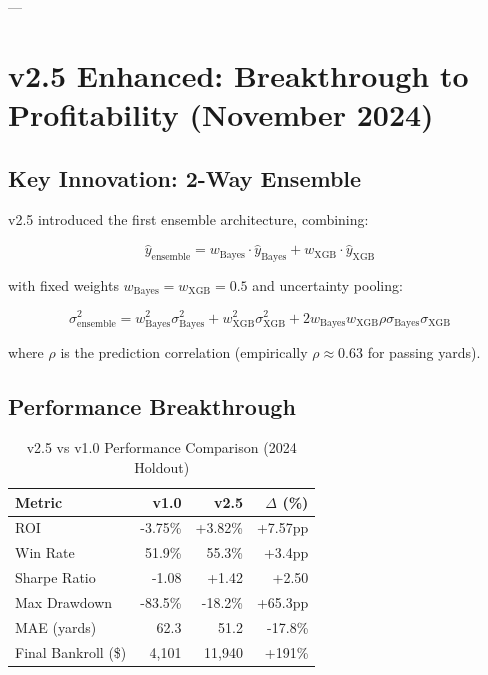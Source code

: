 ---

\section{v2.5 Enhanced: Breakthrough to Profitability (November 2024)}

\subsection{Key Innovation: 2-Way Ensemble}

v2.5 introduced the first ensemble architecture, combining:

\begin{equation}
\hat{y}_{\text{ensemble}} = w_{\text{Bayes}} \cdot \hat{y}_{\text{Bayes}} + w_{\text{XGB}} \cdot \hat{y}_{\text{XGB}}
\label{eq:v2-5-ensemble}
\end{equation}

with fixed weights $w_{\text{Bayes}} = w_{\text{XGB}} = 0.5$ and uncertainty pooling:

\begin{equation}
\sigma^2_{\text{ensemble}} = w_{\text{Bayes}}^2 \sigma^2_{\text{Bayes}} + w_{\text{XGB}}^2 \sigma^2_{\text{XGB}} + 2 w_{\text{Bayes}} w_{\text{XGB}} \rho \sigma_{\text{Bayes}} \sigma_{\text{XGB}}
\label{eq:ensemble-variance}
\end{equation}

where $\rho$ is the prediction correlation (empirically $\rho \approx 0.63$ for passing yards).

\subsection{Performance Breakthrough}

\begin{table}[h]
\centering
\caption{v2.5 vs v1.0 Performance Comparison (2024 Holdout)}
\label{tab:v2-5-vs-v1}
\begin{tabular}{lrrr}
\toprule
\textbf{Metric} & \textbf{v1.0} & \textbf{v2.5} & \textbf{$\Delta$ (\%)} \\
\midrule
ROI & -3.75\% & +3.82\% & +7.57pp \\
Win Rate & 51.9\% & 55.3\% & +3.4pp \\
Sharpe Ratio & -1.08 & +1.42 & +2.50 \\
Max Drawdown & -83.5\% & -18.2\% & +65.3pp \\
MAE (yards) & 62.3 & 51.2 & -17.8\% \\
Final Bankroll (\$) & 4,101 & 11,940 & +191\% \\
\bottomrule
\end{tabular}
\end{table}


